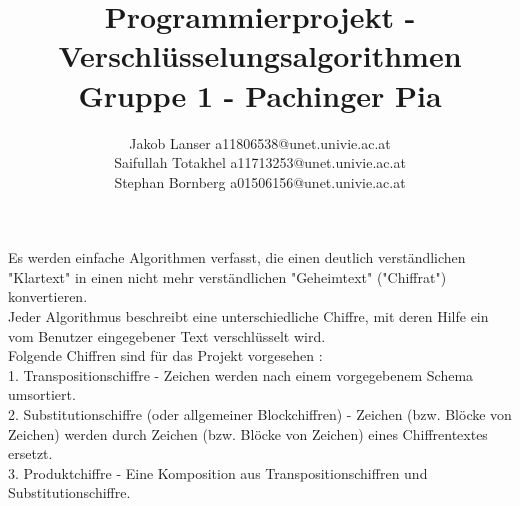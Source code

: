 \documentclass{article}
\title{Programmierprojekt - Verschlüsselungsalgorithmen\\Gruppe 1 -  Pachinger Pia}
\author{Jakob Lanser a11806538@unet.univie.ac.at\\Saifullah Totakhel a11713253@unet.univie.ac.at\\Stephan Bornberg a01506156@unet.univie.ac.at}
\begin{document}
\maketitle

Es werden einfache Algorithmen verfasst, die einen deutlich verständlichen "Klartext" in einen nicht mehr verständlichen "Geheimtext" ("Chiffrat") konvertieren.\\
Jeder Algorithmus beschreibt eine unterschiedliche Chiffre, mit deren Hilfe ein vom Benutzer eingegebener Text verschlüsselt wird.\\
Folgende Chiffren sind für das Projekt vorgesehen :\\
1. Transpositionschiffre - Zeichen werden nach einem vorgegebenem Schema umsortiert.\\
2. Substitutionschiffre (oder allgemeiner Blockchiffren) - Zeichen (bzw. Blöcke von Zeichen) werden durch Zeichen (bzw. Blöcke von Zeichen) eines Chiffrentextes ersetzt.\\
3. Produktchiffre - Eine Komposition aus Transpositionschiffren und Substitutionschiffre.
\end{document}
